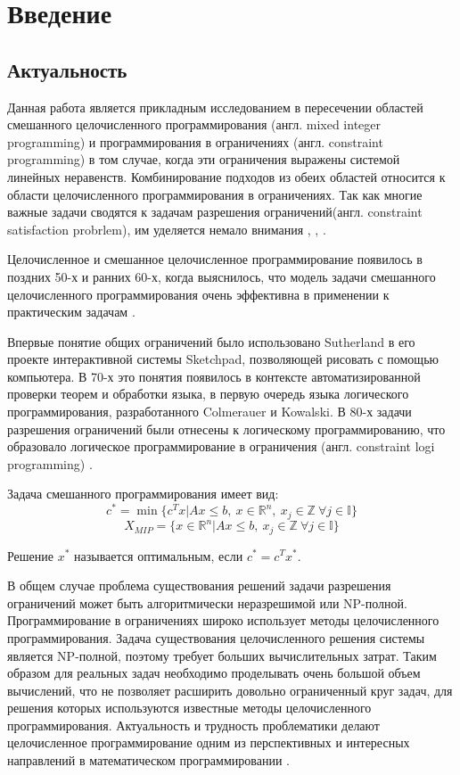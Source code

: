\documentclass[a4paper,14pt,russian]{extreport}
\begin{document}
\newpage
\chapter{Введение}
\section{Актуальность}
Данная работа является прикладным исследованием в пересечении областей смешанного целочисленного программирования (англ. mixed integer programming) и программирования в ограничениях (англ. constraint programming) в том случае, когда эти ограничения выражены системой линейных неравенств. Комбинирование подходов из обеих областей относится к области целочисленного программирования в ограничениях. Так как многие важные задачи сводятся к задачам разрешения ограничений(англ. constraint satisfaction probrlem), им уделяется немало внимания \cite{dechter}, \cite{freuder}, \cite{tsang}. 
\par
Целочисленное и смешанное целочисленное программирование появилось в поздних 50-х и ранних 60-х, когда выяснилось, что модель задачи смешанного целочисленного программирования очень эффективна в применении к практическим задачам \cite{markowitz_manne}.
\par
Впервые понятие общих ограничений было использовано Sutherland\cite{sutherland} в его проекте интерактивной системы Sketchpad, позволяющей рисовать с помощью компьютера. В 70-х это понятия появилось в контексте автоматизированной проверки теорем и обработки языка, в первую очередь языка логического программирования, разработанного Colmerauer\cite{colmerauer}\cite{kanoui_pasero} и Kowalski\cite{kowalski}. В 80-х задачи разрешения ограничений были отнесены к логическому программированию, что образовало логическое программирование в ограничения (англ. constraint logi programming) \cite{jaffar_lassez}\cite{dincbas}\cite{colmerauer_2}.
\par
Задача смешанного программирования имеет вид:
$$c^* = \min\{c^Tx|Ax\le b,~ x\in \mathbb{R}^n,~ x_j\in\mathbb{Z}~ \forall j\in\mathbb{I}\}$$
$$X_{MIP}=\{x\in\mathbb{R}^n|Ax\le b,~ x_j\in\mathbb{Z}~ \forall j\in\mathbb{I}\}$$
\par
Решение $x^*$ называется оптимальным, если $c^* = c^Tx^*$.
\par
В общем случае проблема существования решений задачи разрешения ограничений может быть алгоритмически неразрешимой или NP-полной. Программирование в ограничениях широко использует методы целочисленного программирования. Задача существования целочисленного решения системы является NP-полной, поэтому требует больших вычислительных затрат. Таким образом для реальных задач необходимо проделывать очень большой объем вычислений, что не позволяет расширить довольно ограниченный круг задач, для решения которых используются известные методы целочисленного программирования. Актуальность и трудность проблематики делают целочисленное программирование одним из перспективных и интересных направлений в математическом программировании \cite{karmanov}\cite {balinski}.
\end{document}
